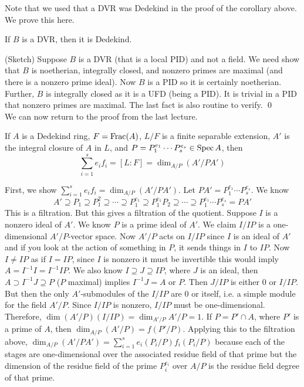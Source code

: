 Note that we used that a DVR was Dedekind in the proof of the corollary above. We prove this here.

\begin{prop}
If $B$ is a DVR, then it is Dedekind. 
\end{prop}

\pf (Sketch) Suppose $B$ is a DVR (that is a local PID) and not a field. We need show that $B$ is noetherian, integrally closed, and nonzero primes are maximal (and there is a nonzero prime ideal). Now $B$ is a PID so it is certainly noetherian. Further, $B$ is integrally closed as it is a UFD (being a PID). It is trivial in a PID that nonzero primes are maximal. The last fact is also routine to verify. \qed \\


We can now return to the proof from the last lecture.


\begin{thm}
If $A$ is a Dedekind ring, $F=\operatorname{Frac}(A)$, $L/F$ is a finite separable extension, $A'$ is the integral closure of $A$ in $L$, and $P=P_1^{e_1}\cdots P_s^{e_s} \in \operatorname{Spec} A$, then
	\[
	\sum_{i=1}^s e_if_i = [L:F]=\dim_{A/P}(A'/PA')
	\]
\end{thm}

\pf First, we show $\sum_{i=1}^s e_if_i= \dim_{A/P}(A'/PA')$. Let $PA'=P_1^{e_1}\cdots P_s^{e_s}$. We know 
	\[
	A' \supseteq P_1 \supseteq P_1^2 \supseteq \cdots \supseteq P_1^{e_1} \supseteq P_1^{e_1}P_2 \supseteq \cdots \supseteq P_1^{e_1}\cdots P_s^{e_s}=PA'
	\]
This is a filtration. But this gives a filtration of the quotient. Suppose $I$ is a nonzero ideal of $A'$. We know $P$ is a prime ideal of $A'$. We claim $I/IP$ is a one-dimensional $A'/P$-vector space. Now $A'/P$ acts on $I/IP$ since $I$ is an ideal of $A'$ and if you look at the action of something in $P$, it sends things in $I$ to $IP$. Now $I\neq IP$ as if $I=IP$, since $I$ is nonzero it must be invertible this would imply $A=I^{-1}I=I^{-1}IP$. We also know $I \supseteq J \supseteq IP$, where $J$ is an ideal, then $A \supset I^{-1}J \supseteq P$ ($P$ maximal) implies $I^{-1}J=A$ or $P$. Then $J/IP$ is either 0 or $I/IP$. But then the only $A'$-submodules of the $I/IP$ are 0 or itself, i.e. a simple module for the field $A'/P$. Since $I/IP$ is nonzero, $I/IP$ must be one-dimensional. Therefore, $\dim(A'/P)(I/IP)=\dim_{A'/P} A'/P=1$. If $P=P' \cap A$, where $P'$ is a prime of $A$, then $\dim_{A/P}(A'/P)=f(P'/P)$. Applying this to the filtration above, $\dim_{A/P}(A'/PA')=\sum_{i=1}^s e_i(P_i/P) f_i(P_i/P)$ because each of the stages are one-dimensional over the associated residue field of that prime but the dimension of the residue field of the prime $P_i^{e_i}$ over $A/P$ is the residue field degree of that prime. 

